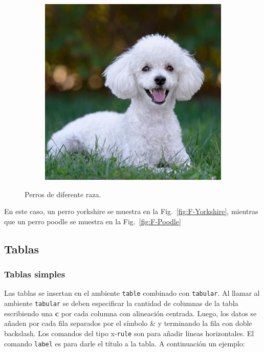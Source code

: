 \begin{figure}[h]
\begin{subfigure}[t]{0.3435\textwidth}
{        \includegraphics[width=\textwidth]{F-Poodle.jpg}
        }%
    \end{subfigure}
    \caption{Perros de diferente raza.}\label{fig:Dos-Perros}
\end{figure}

En este caso, un perro yorkshire se muestra en la Fig.~\ref{fig:F-Yorkshire}, mientras que un perro poodle se muestra en la Fig.~\ref{fig:F-Poodle}

\subsection{Tablas}
\subsubsection{Tablas simples}
Las tablas se insertan en el ambiente \verb!table! combinado con \verb!tabular!. Al llamar al ambiente \verb!tabular! se deben especificar la cantidad de columnas de la tabla escribiendo una \textbf{c} por cada columna con alineación centrada. Luego, los datos se añaden por cada fila separados por el símbolo \& y terminando la fila con doble backslash. Los comandos del tipo x-\verb!rule! son para añadir líneas horizontales. El comando \verb!label! es para darle el título a la tabla. A continuación un ejemplo:

